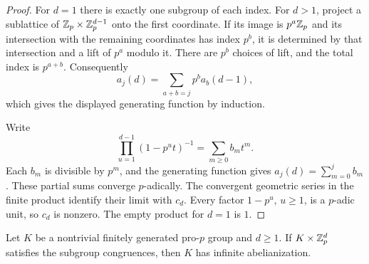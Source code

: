 \begin{proof}
For $d=1$ there is exactly one subgroup of each index.
For $d>1$, project a sublattice of
$\mathbb Z_p\times\mathbb Z_p^{d-1}$ onto the first coordinate.  If its image is
$p^a\mathbb Z_p$ and its intersection with the remaining coordinates has
index $p^b$, it is determined by that intersection and a lift of
$p^a$ modulo it.  There are $p^b$ choices of lift, and the total index
is $p^{a+b}$.  Consequently
\[
 a_j(d)=\sum_{a+b=j}p^b a_b(d-1),
\]
which gives the displayed generating function by induction.

Write
\[
 \prod_{u=1}^{d-1}(1-p^u t)^{-1}
        =\sum_{m\geq0}b_m t^m.
\]
Each $b_m$ is divisible by $p^m$, and the generating function gives
$a_j(d)=\sum_{m=0}^j b_m$.  These partial sums converge $p$-adically.
The convergent geometric series in the finite product identify their
limit with $c_d$.  Every factor $1-p^u$, $u\geq1$, is a $p$-adic unit,
so $c_d$ is nonzero.  The empty product for $d=1$ is $1$.
\end{proof}

\begin{lemma}\label{lem:kernel-abelianization}
Let $K$ be a nontrivial finitely generated pro-$p$ group and $d\geq1$.
If $K\times\mathbb Z_p^d$ satisfies the subgroup congruences, then $K$ has
infinite abelianization.
\end{lemma}

